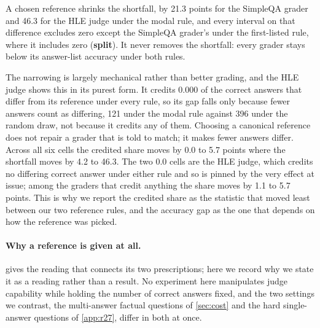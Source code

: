 
\noindent A chosen reference shrinks the shortfall, by 21.3 points for the SimpleQA grader and 46.3 for the
HLE judge under the modal rule, and every interval on that difference excludes zero except the SimpleQA
grader's under the first-listed rule, where it includes zero (\textbf{split}). It never removes the
shortfall: every grader stays below its answer-list accuracy under both rules.

The narrowing is largely mechanical rather than better grading, and the HLE judge shows this in its purest
form. It credits 0.000 of the correct answers that differ from its reference under every rule, so its gap
falls only because fewer answers count as differing, 121 under the modal rule against 396 under the random
draw, not because it credits any of them. Choosing a canonical reference does not repair a grader that is
told to match; it makes fewer answers differ. Across all six cells the credited share moves by 0.0 to 5.7
points where the shortfall moves by 4.2 to 46.3. The two 0.0 cells are the HLE judge, which credits no
differing correct answer under either rule and so is pinned by the very effect at issue; among the graders
that credit anything the share moves by 1.1 to 5.7 points. This is why we report the
credited share as the statistic that moved least between our two reference rules, and the accuracy gap as
the one that depends on how the reference was picked.

\paragraph{Why a reference is given at all.}
 gives the reading that connects its two prescriptions; here we record why we state it as a
reading rather than a result. No experiment here manipulates judge capability while holding the number of
correct answers fixed, and the two settings we contrast, the multi-answer factual questions of
\cref{sec:cost} and the hard single-answer questions of \cref{app:r27}, differ in both at once.

\FloatBarrier
